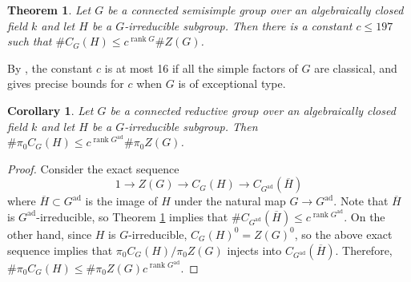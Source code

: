 \documentclass[11pt, letterpaper,english]{amsart}
\theoremstyle{plain}
\newtheorem{thm}[lem]{Theorem}
\newtheorem{cor}[lem]{Corollary}
\theoremstyle{definition}
\numberwithin{equation}{section}
\numberwithin{lem}{section}
\DeclareMathOperator{\rank}{rank}
\DeclareMathOperator{\ad}{ad}
\newcommand{\cent}[2]{C_{#1}(#2)}
\begin{document}
\begin{thm} \label{thm:liebeck}
Let $G$ be a connected semisimple group over an algebraically closed field $k$ and let $H$ be a $G$-irreducible subgroup. Then there is a constant $c \leq 197$ such that $\# \cent{G}{H} \leq c^{\rank G}\# Z(G)$.
\end{thm}

By \cite{liebeck}, the constant $c$ is at most 16 if all the simple factors of $G$ are classical, and \cite[Lemma 2.5]{liebeck} gives precise bounds for $c$ when $G$ is of exceptional type. 

\begin{cor} \label{cor:liebeck}
Let $G$ be a connected reductive group over an algebraically closed field $k$ and let $H$ be a $G$-irreducible subgroup. Then 
$\# \pi_0 \cent{G}{H} \leq c^{\rank G^{\ad}} \# \pi_0 Z(G)$.
\end{cor}

\begin{proof}
Consider the exact sequence
\[ 1 \to Z(G) \to \cent{G}{H} \to \cent{G^{\ad}}{\overline{H}} \] 
where $\overline{H} \subset G^{\ad}$ is the image of $H$ under the natural map $G \to G^{\ad}$. 
Note that $\overline{H}$ is $G^{\ad}$-irreducible, so Theorem \ref{thm:liebeck} implies that 
$\# \cent{G^{\ad}}{\overline{H}} \leq c^{\rank G^{\ad}}$. On the other hand, since $H$ is $G$-irreducible, $\cent{G}{H}^0 = Z(G)^0$, so the above exact sequence implies that $\pi_0 \cent{G}{H}/\pi_0 Z(G)$ injects into $\cent{G^{\ad}}{\overline{H}}$. Therefore, 
$\# \pi_0 \cent{G}{H} \leq \# \pi_0 Z(G) c^{\rank G^{\ad}}$.
\end{proof}
\end{document}
